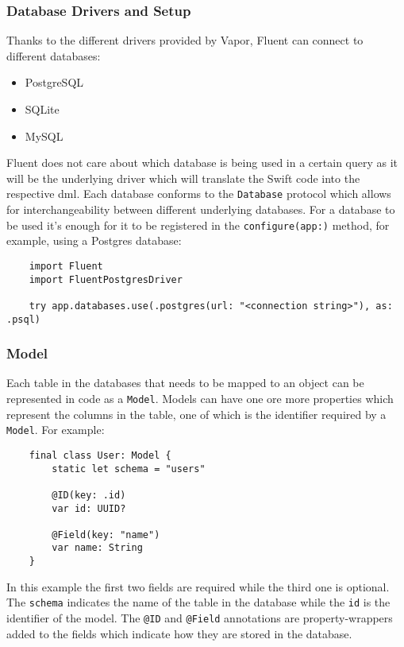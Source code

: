 \subsubsection{Database Drivers and Setup}
Thanks to the different drivers provided by Vapor, Fluent can connect to different databases:
\begin{itemize}
    \item PostgreSQL
    \item SQLite
    \item MySQL
\end{itemize}
Fluent does not care about which database is being used in a certain query as it will be the underlying driver which will translate the Swift code into the respective \gls{dml}. Each database conforms to the \lstinline{Database} protocol which allows for interchangeability between different underlying databases. For a database to be used it's enough for it to be registered in the \lstinline{configure(app:)} method, for example, using a Postgres database:
\begin{verbatim}
    import Fluent
    import FluentPostgresDriver

    try app.databases.use(.postgres(url: "<connection string>"), as: .psql)
\end{verbatim}
\cite{vapor-docs}

\subsubsection{Model}
Each table in the databases that needs to be mapped to an object can be represented in code as a \lstinline{Model}. Models can have one ore more properties which represent the columns in the table, one of which is the identifier required by a \lstinline{Model}. For example:
\begin{verbatim}
    final class User: Model {
        static let schema = "users"

        @ID(key: .id)
        var id: UUID?
    
        @Field(key: "name")
        var name: String
    }
\end{verbatim}
In this example the first two fields are required while the third one is optional. The \lstinline{schema} indicates the name of the table in the database while the \lstinline{id} is the identifier of the model.
The \lstinline{@ID} and \lstinline{@Field} annotations are \gls{property-wrapper}s added to the fields which indicate how they are stored in the database. \cite{vapor-docs}

